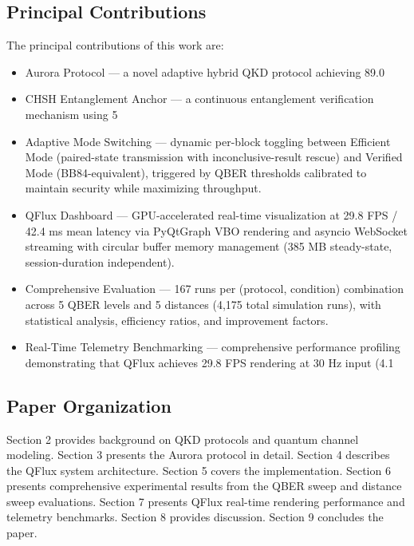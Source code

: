 \subsection{Principal Contributions}
The principal contributions of this work are:

\begin{itemize}
\item Aurora Protocol — a novel adaptive hybrid QKD protocol achieving 89.0%
\item CHSH Entanglement Anchor — a continuous entanglement verification mechanism using 5%
\item Adaptive Mode Switching — dynamic per-block toggling between Efficient Mode (paired-state transmission with inconclusive-result rescue) and Verified Mode (BB84-equivalent), triggered by QBER thresholds calibrated to maintain security while maximizing throughput.
\item QFlux Dashboard — GPU-accelerated real-time visualization at 29.8 FPS / 42.4 ms mean latency via PyQtGraph VBO rendering and asyncio WebSocket streaming with circular buffer memory management (385 MB steady-state, session-duration independent).
\item Comprehensive Evaluation — 167 runs per (protocol, condition) combination across 5 QBER levels and 5 distances (4,175 total simulation runs), with statistical analysis, efficiency ratios, and improvement factors.
\item Real-Time Telemetry Benchmarking — comprehensive performance profiling demonstrating that QFlux achieves 29.8 FPS rendering at 30 Hz input (4.1%
\end{itemize}


\subsection{Paper Organization}
Section 2 provides background on QKD protocols and quantum channel modeling. Section 3 presents the Aurora protocol in detail. Section 4 describes the QFlux system architecture. Section 5 covers the implementation. Section 6 presents comprehensive experimental results from the QBER sweep and distance sweep evaluations. Section 7 presents QFlux real-time rendering performance and telemetry benchmarks. Section 8 provides discussion. Section 9 concludes the paper.

